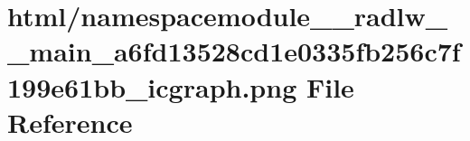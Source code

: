 \hypertarget{namespacemodule____radlw____main__a6fd13528cd1e0335fb256c7f199e61bb__icgraph_8png}{}\section{html/namespacemodule\+\_\+\+\_\+radlw\+\_\+\+\_\+main\+\_\+a6fd13528cd1e0335fb256c7f199e61bb\+\_\+icgraph.png File Reference}
\label{namespacemodule____radlw____main__a6fd13528cd1e0335fb256c7f199e61bb__icgraph_8png}
